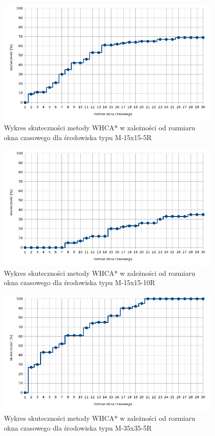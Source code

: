 \begin{figure}
	\centering
	\includegraphics[width=0.8\columnwidth]{img/plots/test-whca-window-M-15x15-5R}
	\caption{Wykres skuteczności metody WHCA* w zależności od rozmiaru okna czasowego dla środowiska typu M-15x15-5R}
	\label{fig:test-whca-window-M-15x15-5R}
\end{figure}
\begin{figure}
	\centering
	\includegraphics[width=0.8\columnwidth]{img/plots/test-whca-window-M-15x15-10R}
	\caption{Wykres skuteczności metody WHCA* w zależności od rozmiaru okna czasowego dla środowiska typu M-15x15-10R}
	\label{fig:test-whca-window-M-15x15-10R}
\end{figure}
\begin{figure}
	\centering
	\includegraphics[width=0.8\columnwidth]{img/plots/test-whca-window-M-35x35-5R}
	\caption{Wykres skuteczności metody WHCA* w zależności od rozmiaru okna czasowego dla środowiska typu M-35x35-5R}
	\label{fig:test-whca-window-M-35x35-5R}
\end{figure}
